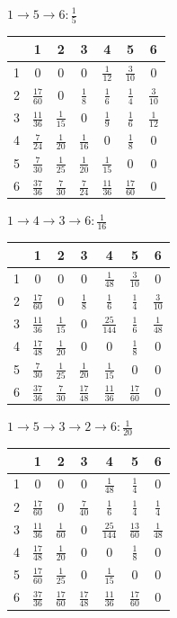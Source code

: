 \documentclass[russian]{article}
\begin{document}
$ 1 \to 5 \to 6 : \frac{1}{5}$

\begin{tabular}{|c|c|c|c|c|c|c|}\hline
& 1& 2& 3& 4& 5& 6\\\hline
1& $0$& $0$& $0$& $\frac{1}{12}$& $\frac{3}{10}$& $0$\\\hline
2& $\frac{17}{60}$& $0$& $\frac{1}{8}$& $\frac{1}{6}$& $\frac{1}{4}$& $\frac{3}{10}$\\\hline
3& $\frac{11}{36}$& $\frac{1}{15}$& $0$& $\frac{1}{9}$& $\frac{1}{6}$& $\frac{1}{12}$\\\hline
4& $\frac{7}{24}$& $\frac{1}{20}$& $\frac{1}{16}$& $0$& $\frac{1}{8}$& $0$\\\hline
5& $\frac{7}{30}$& $\frac{1}{25}$& $\frac{1}{20}$& $\frac{1}{15}$& $0$& $0$\\\hline
6& $\frac{37}{36}$& $\frac{7}{30}$& $\frac{7}{24}$& $\frac{11}{36}$& $\frac{17}{60}$& $0$\\\hline
\end{tabular}

$ 1 \to 4 \to 3 \to 6 : \frac{1}{16}$

\begin{tabular}{|c|c|c|c|c|c|c|}\hline
& 1& 2& 3& 4& 5& 6\\\hline
1& $0$& $0$& $0$& $\frac{1}{48}$& $\frac{3}{10}$& $0$\\\hline
2& $\frac{17}{60}$& $0$& $\frac{1}{8}$& $\frac{1}{6}$& $\frac{1}{4}$& $\frac{3}{10}$\\\hline
3& $\frac{11}{36}$& $\frac{1}{15}$& $0$& $\frac{25}{144}$& $\frac{1}{6}$& $\frac{1}{48}$\\\hline
4& $\frac{17}{48}$& $\frac{1}{20}$& $0$& $0$& $\frac{1}{8}$& $0$\\\hline
5& $\frac{7}{30}$& $\frac{1}{25}$& $\frac{1}{20}$& $\frac{1}{15}$& $0$& $0$\\\hline
6& $\frac{37}{36}$& $\frac{7}{30}$& $\frac{17}{48}$& $\frac{11}{36}$& $\frac{17}{60}$& $0$\\\hline
\end{tabular}

$ 1 \to 5 \to 3 \to 2 \to 6 : \frac{1}{20}$

\begin{tabular}{|c|c|c|c|c|c|c|}\hline
& 1& 2& 3& 4& 5& 6\\\hline
1& $0$& $0$& $0$& $\frac{1}{48}$& $\frac{1}{4}$& $0$\\\hline
2& $\frac{17}{60}$& $0$& $\frac{7}{40}$& $\frac{1}{6}$& $\frac{1}{4}$& $\frac{1}{4}$\\\hline
3& $\frac{11}{36}$& $\frac{1}{60}$& $0$& $\frac{25}{144}$& $\frac{13}{60}$& $\frac{1}{48}$\\\hline
4& $\frac{17}{48}$& $\frac{1}{20}$& $0$& $0$& $\frac{1}{8}$& $0$\\\hline
5& $\frac{17}{60}$& $\frac{1}{25}$& $0$& $\frac{1}{15}$& $0$& $0$\\\hline
6& $\frac{37}{36}$& $\frac{17}{60}$& $\frac{17}{48}$& $\frac{11}{36}$& $\frac{17}{60}$& $0$\\\hline
\end{tabular}
\end{document}

